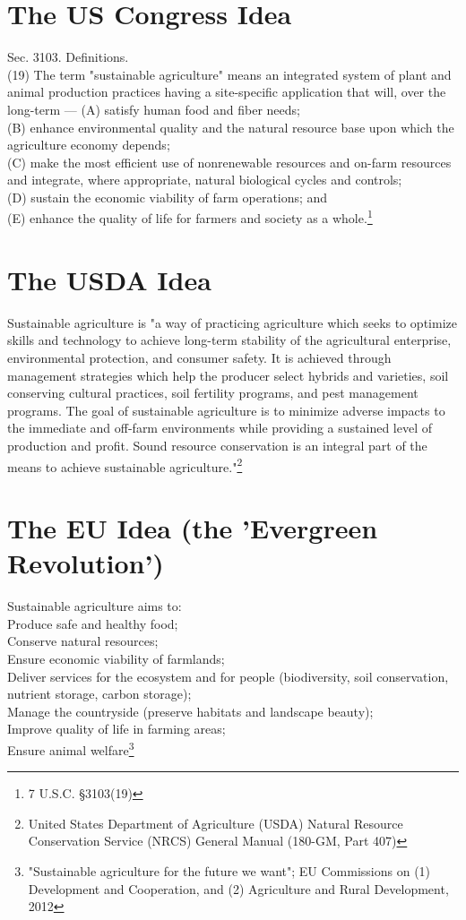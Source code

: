 \section{The US Congress Idea}
\noindent Sec. 3103. Definitions.\\
(19) The term "sustainable agriculture" means an integrated system of plant and animal production practices having a site-specific application that will, over the long-term —
(A) satisfy human food and fiber needs;\\
(B) enhance environmental quality and the natural resource base upon which the agriculture economy depends;\\
(C) make the most efficient use of nonrenewable resources and on-farm resources and integrate, where appropriate, natural biological cycles and controls;\\
(D) sustain the economic viability of farm operations; and\\
(E) enhance the quality of life for farmers and society as a whole.\footnote{7 U.S.C. \S 3103(19)}


\section{The USDA Idea}
\noindent Sustainable agriculture is "a way of practicing agriculture which seeks to optimize skills and technology to achieve long-term stability of  the agricultural enterprise, environmental protection, and consumer safety. It is achieved through management strategies which help the producer select hybrids and varieties, soil conserving cultural practices, soil fertility programs, and pest management programs. The goal of sustainable agriculture is to minimize adverse impacts to the immediate and off-farm environments while providing a sustained level of production and profit. Sound resource conservation is an integral part of the means to achieve sustainable agriculture."\footnote{United States Department of Agriculture (USDA) Natural Resource Conservation Service (NRCS) General Manual (180-GM, Part 407)} 


\section{The EU Idea (the 'Evergreen Revolution')}
\noindent Sustainable agriculture aims to:\\
Produce safe and healthy food;\\
Conserve natural resources;\\
Ensure economic viability of farmlands;\\
Deliver services for the ecosystem and for people (biodiversity, soil conservation, nutrient storage, carbon storage);\\
Manage the countryside (preserve habitats and landscape beauty); \\
Improve quality of life in farming areas;\\
Ensure animal welfare\footnote{"Sustainable agriculture for the future we want"; EU Commissions on (1) Development and Cooperation, and (2) Agriculture and Rural Development, 2012}


